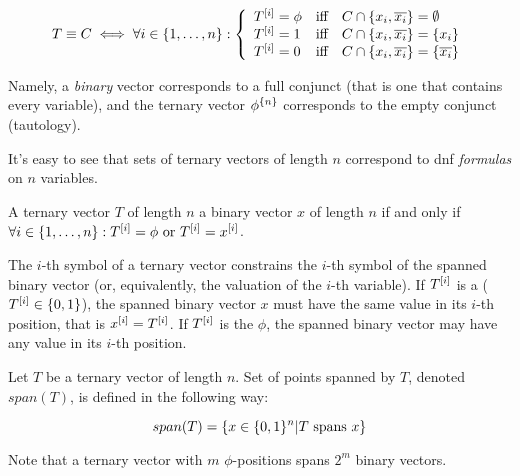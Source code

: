 \[
T \equiv C \iff \fora{i \in \curly{1, \ldots, n}}{
\left\{
  \begin{array}{lll}
    \bit{T}{i} = \phi & \text{iff} & C \cap \curly{x_i, \overline{x_i}} = \emptyset \\
    \bit{T}{i} = 1 & \text{iff} & C \cap \curly{x_i, \overline{x_i}} = \curly{x_i} \\
    \bit{T}{i} = 0 & \text{iff} & C \cap \curly{x_i, \overline{x_i}} = \curly{\overline{x_i}}
  \end{array}
\right.
}
\]

Namely,
a \emph{binary} vector corresponds to a full conjunct
(that is one that contains every variable),
and the ternary vector $\phi^{\{n\}}$
corresponds to the empty conjunct (tautology).

It's easy to see that sets of ternary vectors of length $n$
correspond to \acrshort{dnf} \emph{formulas}
on $n$ variables.

\begin{definition}[Spanning]
A ternary vector $T$ of length $n$ 
a binary vector $x$ of length $n$
if and only if
$\forall i \in \{1, \ldots, n\} : T^{[i]} = \phi \text{ or } T^{[i]} = x^{[i]}$.
\end{definition}

The $i$-th symbol of a ternary vector
constrains the $i$-th symbol of the spanned binary vector
(or, equivalently, the valuation of the $i$-th variable).
If $T^{[i]}$ is a 
($T^{[i]} \in \{0, 1\}$),
the spanned binary vector $x$
must have the same value
in its $i$-th position,
that is $x^{[i]} = T^{[i]}$.
If $T^{[i]}$ is the  $\phi$,
the spanned binary vector
may have any value in its $i$-th position.

\begin{definition}
Let $T$ be a ternary vector of length $n$.
Set of points spanned by $T$,
denoted $span(T)$,
is defined in the following way:

\begin{equation*}
span(T) = \{
x \in \{0, 1\}^n |
T\text{ spans }x
\}
\end{equation*}
\end{definition}

Note that a ternary vector
with $m$ $\phi$-positions
spans $2^m$ binary vectors.


